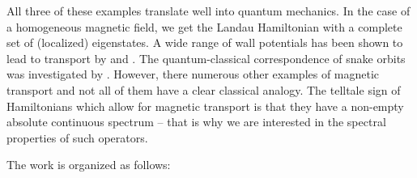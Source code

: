 All three of these examples translate well into quantum mechanics. In the case of a homogeneous magnetic field, we get the Landau Hamiltonian with a complete set of (localized) eigenstates. A wide range of wall potentials has been shown to lead to transport by \cite{Macris1999} and \cite{Frohlich2000}. The quantum-classical correspondence of snake orbits was investigated by \cite{Reijniers2000}. However, there numerous other examples of magnetic transport and not all of them have a clear classical analogy. The telltale sign of Hamiltonians which allow for magnetic transport is that they have a non-empty absolute continuous spectrum – that is why we are interested in the spectral properties of such operators.

The work is organized as follows:

